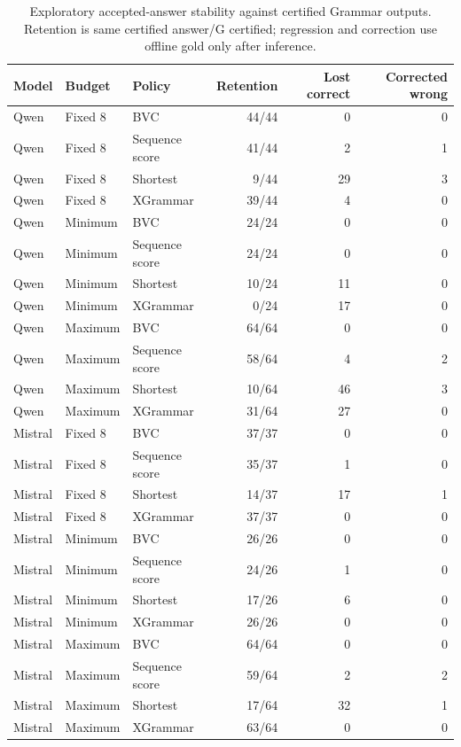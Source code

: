 \documentclass[12pt,a4paper]{article}
\begin{document}
\begin{longtable}{@{}lllrrr@{}}
\caption{Exploratory accepted-answer stability against certified Grammar outputs. Retention is same certified answer/G certified; regression and correction use offline gold only after inference.}\label{tab:stabilityall}\\
\toprule
Model & Budget & Policy & Retention & Lost correct & Corrected wrong \\
\midrule
\endhead
Qwen & Fixed 8 & BVC & 44/44 & 0 & 0 \\
Qwen & Fixed 8 & Sequence score & 41/44 & 2 & 1 \\
Qwen & Fixed 8 & Shortest & 9/44 & 29 & 3 \\
Qwen & Fixed 8 & XGrammar & 39/44 & 4 & 0 \\
Qwen & Minimum & BVC & 24/24 & 0 & 0 \\
Qwen & Minimum & Sequence score & 24/24 & 0 & 0 \\
Qwen & Minimum & Shortest & 10/24 & 11 & 0 \\
Qwen & Minimum & XGrammar & 0/24 & 17 & 0 \\
Qwen & Maximum & BVC & 64/64 & 0 & 0 \\
Qwen & Maximum & Sequence score & 58/64 & 4 & 2 \\
Qwen & Maximum & Shortest & 10/64 & 46 & 3 \\
Qwen & Maximum & XGrammar & 31/64 & 27 & 0 \\
Mistral & Fixed 8 & BVC & 37/37 & 0 & 0 \\
Mistral & Fixed 8 & Sequence score & 35/37 & 1 & 0 \\
Mistral & Fixed 8 & Shortest & 14/37 & 17 & 1 \\
Mistral & Fixed 8 & XGrammar & 37/37 & 0 & 0 \\
Mistral & Minimum & BVC & 26/26 & 0 & 0 \\
Mistral & Minimum & Sequence score & 24/26 & 1 & 0 \\
Mistral & Minimum & Shortest & 17/26 & 6 & 0 \\
Mistral & Minimum & XGrammar & 26/26 & 0 & 0 \\
Mistral & Maximum & BVC & 64/64 & 0 & 0 \\
Mistral & Maximum & Sequence score & 59/64 & 2 & 2 \\
Mistral & Maximum & Shortest & 17/64 & 32 & 1 \\
Mistral & Maximum & XGrammar & 63/64 & 0 & 0 \\
\bottomrule
\end{longtable}
\end{document}
